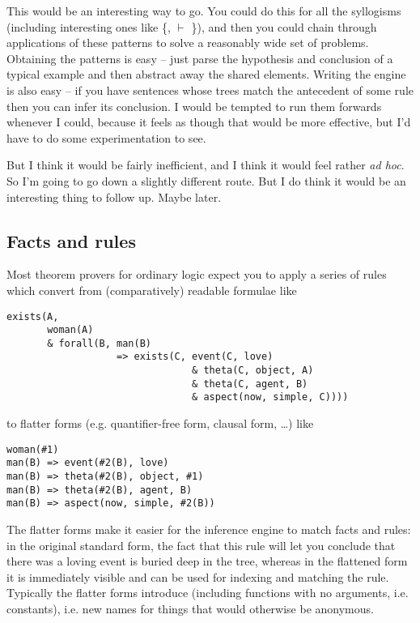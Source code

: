 \documentclass[11pt,a4paper]{article}
\begin{document}
\medpara
This would be an interesting way to go. You could do this for all the
syllogisms (including interesting ones like \{,  $\vdash$ \}), and then you could chain through applications of these
patterns to solve a reasonably wide set of problems. Obtaining the
patterns is easy -- just parse the hypothesis and conclusion of a
typical example and then abstract away the shared elements. Writing
the engine is also easy -- if you have sentences whose trees match the
antecedent of some rule then you can infer its conclusion. I would be
tempted to run them forwards whenever I could, because it feels as
though that would be more effective, but I'd have to do some
experimentation to see. 

But I think it would be fairly inefficient, and I think it would feel
rather \textit{ad hoc}. So I'm going to go down a slightly different
route. But I do think it would be an interesting thing to follow
up. Maybe later.

\subsection{Facts and rules}

Most theorem provers for ordinary logic expect you to apply a series
of  rules which convert from (comparatively)
readable formulae like

\begin{Verbatim}[commandchars=\\\{\}]
exists(A,
       woman(A)
       & forall(B, man(B) 
                   => exists(C, event(C, love)
                                & theta(C, object, A)
                                & theta(C, agent, B) 
                                & aspect(now, simple, C))))
\end{Verbatim}

\noindent
to flatter forms (e.g. quantifier-free form, clausal form, \ldots)
like

\begin{Verbatim}[commandchars=\\\{\}]
woman(#1)
man(B) => event(#2(B), love)
man(B) => theta(#2(B), object, #1)
man(B) => theta(#2(B), agent, B) 
man(B) => aspect(now, simple, #2(B))
\end{Verbatim}

\medpara
The flatter forms make it easier for the inference engine to match
facts and rules: in the original standard form, the fact that this
rule will let you conclude that there was a loving event is buried
deep in the tree, whereas in the flattened form it is immediately
visible and can be used for indexing and matching the rule. Typically
the flatter forms introduce  (including
functions with no arguments, i.e. constants), i.e. new names for
things that would otherwise be anonymous. 
\end{document}
